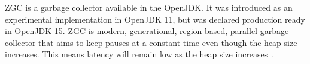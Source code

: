 ZGC is a garbage collector available in the OpenJDK. It was introduced as an experimental implementation in OpenJDK 11, but was declared production ready in OpenJDK 15. ZGC is modern, generational, region-based, parallel garbage collector that aims to keep pauses at a constant time even though the heap size increases. This means latency will remain low as the heap size increases~\cite{zgc:deepdive}.

